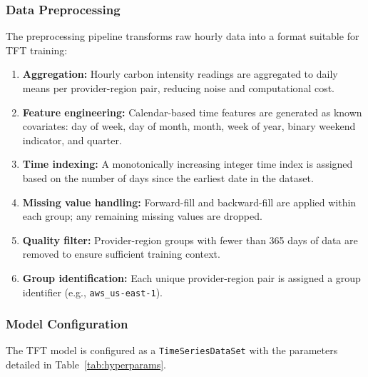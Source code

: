 \documentclass[12pt]{article}
\begin{document}
\subsubsection{Data Preprocessing}

The preprocessing pipeline transforms raw hourly data into a format suitable for TFT training:

\begin{enumerate}
    \item \textbf{Aggregation:} Hourly carbon intensity readings are aggregated to daily means per provider-region pair, reducing noise and computational cost.
    \item \textbf{Feature engineering:} Calendar-based time features are generated as known covariates: day of week, day of month, month, week of year, binary weekend indicator, and quarter.
    \item \textbf{Time indexing:} A monotonically increasing integer time index is assigned based on the number of days since the earliest date in the dataset.
    \item \textbf{Missing value handling:} Forward-fill and backward-fill are applied within each group; any remaining missing values are dropped.
    \item \textbf{Quality filter:} Provider-region groups with fewer than 365 days of data are removed to ensure sufficient training context.
    \item \textbf{Group identification:} Each unique provider-region pair is assigned a group identifier (e.g., \texttt{aws\_us-east-1}).
\end{enumerate}

\subsubsection{Model Configuration}

The TFT model is configured as a \texttt{TimeSeriesDataSet} with the parameters detailed in Table~\ref{tab:hyperparams}.
\end{document}
